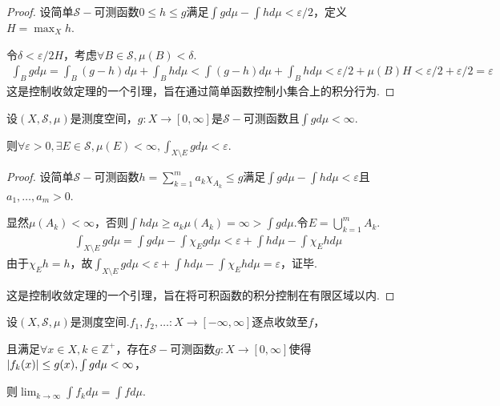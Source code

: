 \begin{proof}
    设简单\(\mathcal{S}-\)可测函数\(0 \leq h \leq g\)满足\(\int g d\mu-\int h d\mu<\varepsilon/2\)，定义\(H=\max_X h\).

    令\(\delta<\varepsilon/2H\)，考虑\(\forall B \in \mathcal{S}, \mu(B)<\delta\).
    \begin{align*}
        \int_B g d\mu=\int_B (g-h) d\mu+\int_B h d\mu<\int (g-h) d\mu+\int_B h d\mu<\varepsilon/2+\mu(B)H<\varepsilon/2+\varepsilon/2=\varepsilon
    \end{align*}
    {\kaishu 这是控制收敛定理的一个引理，旨在通过简单函数控制小集合上的积分行为.}
\end{proof}

\begin{theorem}[3.29]\label{3.29}
    设\((X, \mathcal{S}, \mu)\)是测度空间，\(g: X \to [0,\infty]\)是\(\mathcal{S}-\)可测函数且\(\int g d\mu<\infty\).

    则\(\forall \varepsilon>0, \exists E \in \mathcal{S}, \mu(E)<\infty, \int_{X \setminus E} g d\mu<\varepsilon\).
\end{theorem}

\begin{proof}
    设简单\(\mathcal{S}-\)可测函数\(h=\sum_{k=1}^m a_k \chi_{A_k} \leq g\)满足\(\int g d\mu-\int h d\mu<\varepsilon\)且\(a_1, \dots, a_m>0\).

    显然\(\mu(A_k)<\infty\)，否则\(\int h d\mu \geq a_k \mu(A_k)=\infty>\int g d\mu\).令\(E=\bigcup_{k=1}^m A_k\).
    \begin{align*}
        \int_{X \setminus E} g d\mu=\int g d\mu-\int \chi_E g d\mu<\varepsilon+\int h d\mu-\int \chi_E h d\mu
    \end{align*}
    由于\(\chi_E h=h\)，故\(\int_{X \setminus E} g d\mu<\varepsilon+\int h d\mu-\int \chi_E h d\mu=\varepsilon\)，证毕.

    {\kaishu 这是控制收敛定理的一个引理，旨在将可积函数的积分控制在有限区域以内.}
\end{proof}

\newpage

\begin{theorem}[3.31]\label{3.31}
    设\((X, \mathcal{S}, \mu)\)是测度空间.\(f_1, f_2, \dots: X \to [-\infty,\infty]\)逐点收敛至\(f\)，
    
    且满足\(\forall x \in X, k \in \mathbb{Z}^+\)，存在\(\mathcal{S}-\)可测函数\(g: X \to [0,\infty]\)使得\(\abs*{f_k(x)} \leq g(x), \int g d\mu<\infty\)，
    
    则\(\lim_{k \to \infty} \int f_k d\mu=\int f d\mu\).
\end{theorem}

